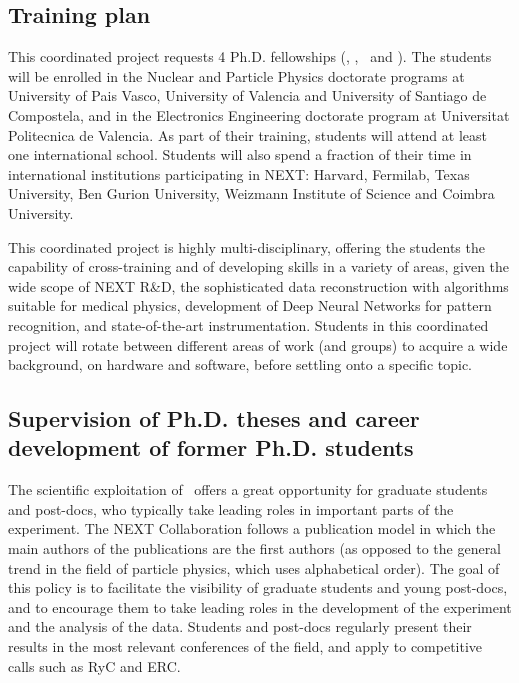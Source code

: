 \subsection{\label{subsubsec:training}Training plan}

\indent 

This coordinated project requests 4 Ph.D. fellowships (\sDIPC, \sIFIC, \sUSC\ and \sUPV). The students will be enrolled in the Nuclear and Particle Physics doctorate programs at University of Pais Vasco, University of Valencia and University of Santiago de Compostela, and in the Electronics Engineering doctorate program at Universitat Politecnica de Valencia. As part of their training, students will attend at least one international school. Students will also spend a fraction of their time in international institutions participating in NEXT: Harvard, Fermilab, Texas University, Ben Gurion University, Weizmann Institute of Science and Coimbra University.

This coordinated project is highly multi-disciplinary, offering the students the capability of cross-training and of developing skills in a variety of areas, given the wide scope of NEXT R\&D, the sophisticated data reconstruction with algorithms suitable for medical physics, development of Deep Neural Networks for pattern recognition, and state-of-the-art instrumentation. Students in this coordinated project will rotate between different areas of work (and groups) to acquire a wide background, on hardware and software, before settling onto a specific topic.

\subsection{Supervision of Ph.D. theses and career development of former Ph.D. students}

The scientific exploitation of \Next\ offers a great opportunity for graduate students and post-docs, who typically take leading roles in important parts of the experiment. The NEXT Collaboration follows a publication model in which the main authors of the publications are the first authors (as opposed to the general trend in the field of particle physics, which uses alphabetical order). The goal of this policy is to facilitate the visibility of graduate students and young post-docs, and to encourage them to take leading roles in the development of the experiment and the analysis of the data. Students and post-docs regularly present their results in the most relevant conferences of the field, and apply to competitive calls such as RyC and ERC. 

